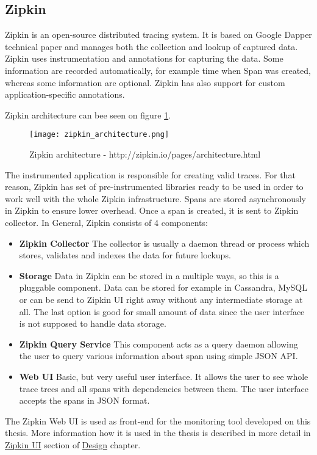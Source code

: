 \subsection{Zipkin}
Zipkin is an open-source distributed tracing system. It is based on Google Dapper technical paper and manages both the collection and lookup of captured data. Zipkin uses instrumentation and annotations for capturing the data. Some
information are recorded automatically, for example time when Span was created, whereas some information are optional. Zipkin has also support for custom application-specific annotations.

Zipkin architecture can bee seen on figure \ref{fig:zipkin_architecture}.
\begin{figure}
	\centering
	\texttt{[image: zipkin\_architecture.png]}
	\caption{Zipkin architecture - http://zipkin.io/pages/architecture.html}
	\label{fig:zipkin_architecture}
\end{figure}
The instrumented application is responsible for creating valid traces. For that reason, Zipkin has set of pre-instrumented libraries ready to be used in order to work well with the whole Zipkin infrastructure. Spans are stored asynchronously in Zipkin to ensure lower overhead. Once a span is created, it is sent to Zipkin collector. In General, Zipkin consists of 4 components:
\begin{itemize}
	\item \textbf{Zipkin Collector} \newline
	The collector is usually a daemon thread or process which stores, validates and indexes the data for future lockups.
	\item\textbf{Storage} \newline
	Data in Zipkin can be stored in a multiple ways, so this is a pluggable component. Data can be stored for example in Cassandra, MySQL or can be send to Zipkin UI right away without any intermediate storage at all. The last option is good for small amount of data since the user interface is not supposed to handle data storage.
	\item \textbf{Zipkin Query Service} \newline
	This component acts as a query daemon allowing the user to query various information about span using simple JSON API.
	\item \textbf{Web UI} \newline
	Basic, but very useful user interface. It allows the user to see whole trace trees and all spans with dependencies between them. The user interface accepts the spans in JSON format.
\end{itemize}
The Zipkin Web UI is used as front-end for the monitoring tool developed on this thesis. More information how it is used in the thesis is described in more detail in \hyperref[sec:zipkin_ui]{Zipkin UI} section of \hyperref[chap:design]{Design} chapter.
 
